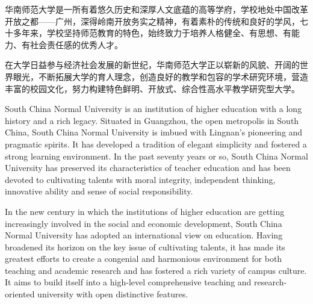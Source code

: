 
\begin{cnabstract}
华南师范大学是一所有着悠久历史和深厚人文底蕴的高等学府，学校地处中国改革开放之都——广州，深得岭南开放务实之精神，有着素朴的传统和良好的学风，七十多年来，学校坚持师范教育的特色，始终致力于培养人格健全、有思想、有能力、有社会责任感的优秀人才。

在大学日益参与经济社会发展的新世纪，华南师范大学正以崭新的风貌、开阔的世界眼光，不断拓展大学的育人理念，创造良好的教学和包容的学术研究环境，营造丰富的校园文化，努力构建特色鲜明、开放式、综合性高水平教学研究型大学。
\end{cnabstract}


\begin{enabstract}
South China Normal University is an institution of higher education with a long history and a rich legacy. Situated in Guangzhou, the open metropolis in South China, South China Normal University is imbued with Lingnan's pioneering and pragmatic spirits. It has developed a tradition of elegant simplicity and fostered a strong learning environment. In the past seventy years or so, South China Normal University has preserved its characteristics of teacher education and has been devoted to cultivating talents with moral integrity, independent thinking, innovative ability and sense of social responsibility.

In the new century in which the institutions of higher education are getting increasingly involved in the social and economic development, South China Normal University has adopted an international view on education. Having broadened its horizon on the key issue of cultivating talents, it has made its greatest efforts to create a congenial and harmonious environment for both teaching and academic research and has fostered a rich variety of campus culture. It aims to build itself into a high-level comprehensive teaching and research-oriented university with open distinctive features.
\end{enabstract}

